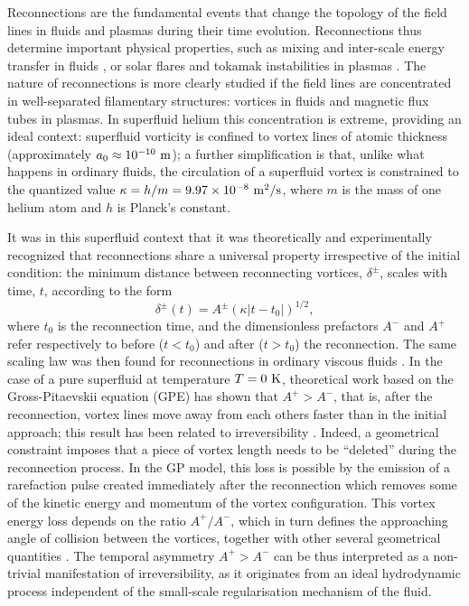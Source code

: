 \documentclass[9pt,twocolumn,twoside]{pnas-new}
\begin{document}
Reconnections are the fundamental events that
change the topology of the field lines in fluids and plasmas during their time evolution. Reconnections thus determine important physical properties, such as mixing and inter-scale energy transfer in fluids \cite{YaoHussainAnnRev2022}, or solar flares and tokamak instabilities in plasmas \cite{Chapman2010}. The nature of reconnections is more clearly studied if the field lines are concentrated in well-separated filamentary structures: vortices in fluids and magnetic flux tubes in plasmas. In superfluid helium this concentration is extreme, providing an ideal context: superfluid vorticity is confined to vortex lines of atomic thickness (approximately $a_0 \approx 10^{-10}~\rm m$); a further simplification 
is that, unlike what happens in ordinary fluids, the
circulation of a superfluid vortex  is constrained to the quantized value $\kappa=h/m=9.97 \times 10^{-8}~\rm m^2/s$, 
where $m$ is the mass of one helium atom and $h$ is Planck's constant. 

It was in this superfluid context that it was theoretically and experimentally recognized
\cite{nazarenko2003,bewley2008,paoletti2010,zuccherQuantumVortexReconnections2012a,villoisUniversalNonuniversalAspects2017a,galantucciCrossoverInteractionDriven2019a,tylutki2021universal}
that reconnections share a universal property irrespective of the initial
condition: the minimum distance between reconnecting 
vortices, $\delta^{\pm}$, scales with time, $t$, according to the form
\begin{equation}
\label{eq:scaling}
	\delta^{\pm}(t) = A^{\pm} (\kappa|t-t_0|)^{1/2},
\end{equation} 
\noindent
where $t_0$ is the reconnection time, and the dimensionless
prefactors $A^-$ and $A^+$ refer respectively to before
($t<t_0$) and after ($t>t_0$) the reconnection. The same scaling law
was then found for reconnections in ordinary viscous fluids 
\cite{yaoSeparationScalingViscous2020}. In the case of a pure
superfluid at temperature $T=0~\rm K$, theoretical work based on
the Gross-Pitaevskii equation (GPE) has shown that
$A^+>A^-$, that is, after the reconnection, vortex lines move away from 
each others faster than in the initial approach; this result has been
related to irreversibility \cite{villoisIrreversibleDynamicsVortex2020,promentMatchingTheoryCharacterize2020}. Indeed, a geometrical constraint imposes 
\cite{promentMatchingTheoryCharacterize2020}
that a piece of vortex length needs to be ``deleted'' 
during the reconnection process. In the GP model, this loss is possible 
by the emission of a rarefaction pulse created immediately after 
the reconnection
\cite{leadbeaterSoundEmissionDue2001b,zuccherQuantumVortexReconnections2012a} which removes some of the kinetic energy and momentum of the vortex configuration.
This vortex energy loss depends on
the ratio $A^+/A^-$, which in turn defines the approaching angle of collision
between the vortices, together with other several geometrical quantities \cite{villoisUniversalNonuniversalAspects2017a,promentMatchingTheoryCharacterize2020}. 
The temporal asymmetry $A^+>A^-$ can be thus interpreted as a non-trivial manifestation of irreversibility, as it originates from an ideal hydrodynamic process independent of the small-scale regularisation mechanism of the fluid.
\end{document}
